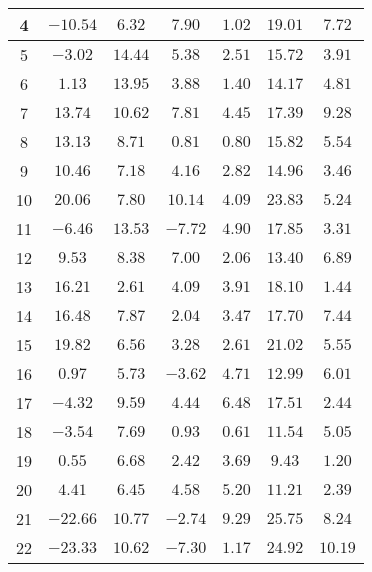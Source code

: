 \begin{table}[H]
\begin{tabular}{|c|c|c|c|c|c|c|}
        4    &  $-10.54$  &  $6.32$   &   $7.90$    &   $1.02$  &  $19.01$  & $7.72$  \\ \hline
        5    &  $-3.02$   &  $14.44$  &   $5.38$    &   $2.51$  &  $15.72$  & $3.91$   \\ \hline
        6    &  $1.13$    &  $13.95$  &   $3.88$    &   $1.40$  &  $14.17$  & $4.81$   \\ \hline
        7    &  $13.74$   &  $10.62$  &   $7.81$    &   $4.45$  &  $17.39$  & $9.28$   \\ \hline
        8    &  $13.13$   &  $8.71$   &   $0.81$    &   $0.80$  &  $15.82$  & $5.54$   \\ \hline
        9    &  $10.46$   &  $7.18$   &   $4.16$    &   $2.82$  &  $14.96$  & $3.46$   \\ \hline
        10   &  $20.06$   &  $7.80$   &   $10.14$   &   $4.09$  &  $23.83$  & $5.24$   \\ \hline
        11   &  $-6.46$   &  $13.53$  &   $-7.72$   &   $4.90$  &  $17.85$  & $3.31$   \\ \hline
        12   &  $9.53$    &  $8.38$   &   $7.00$    &   $2.06$  &  $13.40$  & $6.89$   \\ \hline
        13   &  $16.21$   &  $2.61$   &   $4.09$    &   $3.91$  &  $18.10$  & $1.44$   \\ \hline
        14   &  $16.48$   &  $7.87$   &   $2.04$    &   $3.47$  &  $17.70$  & $7.44$   \\ \hline
        15   &  $19.82$   &  $6.56$   &   $3.28$    &   $2.61$  &  $21.02$  & $5.55$   \\ \hline
        16   &  $0.97$    &  $5.73$   &   $-3.62$   &   $4.71$  &  $12.99$  & $6.01$   \\ \hline
        17   &  $-4.32$   &  $9.59$   &   $4.44$    &   $6.48$  &  $17.51$  & $2.44$   \\ \hline
        18   &  $-3.54$   &  $7.69$   &   $0.93$    &   $0.61$  &  $11.54$  & $5.05$   \\ \hline
        19   &  $0.55$    &  $6.68$   &   $2.42$    &   $3.69$  &  $9.43$   & $1.20$   \\ \hline
        20   &  $4.41$    &  $6.45$   &   $4.58$    &   $5.20$  &  $11.21$  & $2.39$   \\ \hline
        21   &  $-22.66$  &  $10.77$  &   $-2.74$   &   $9.29$  &  $25.75$  & $8.24$   \\ \hline
        22   &  $-23.33$  &  $10.62$  &   $-7.30$   &   $1.17$  &  $24.92$  & $10.19$  \\ \hline

\end{tabular}
\end{table}
